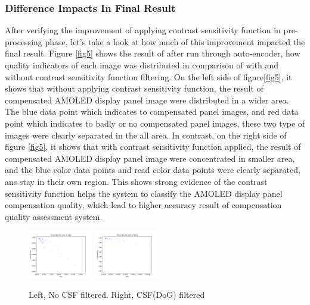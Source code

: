 \documentclass{article}
\begin{document}
\subsubsection{Difference Impacts In Final Result}
After verifying the improvement of applying contrast sensitivity function in pre-processing phase, let's take a look at how much of this improvement impacted the final result. Figure \ref{fig5} shows the result of after run through auto-encoder, how quality indicators of each image was distributed in comparison of with and without contrast sensitivity function filtering.  On the left side of figure\ref{fig5}, it shows that without applying contrast sensitivity function, the result of compensated AMOLED display panel image were distributed in a wider area. The blue data point which indicates to compensated panel images, and red data point which indicates to badly or no compensated panel images, these two type of images were clearly separated in the all area. In contrast, on the right side of figure \ref{fig5}, it shows that with contrast sensitivity function applied, the result of compensated AMOLED display panel image were concentrated in smaller area, and the blue color data points and read color data points were clearly separated, ans stay in their own region. This shows strong evidence of the contrast sensitivity function helps the system to classify the AMOLED display panel compensation quality, which lead to higher accuracy result of compensation quality assessment system.   
\begin{figure}[h]
    \centering
    \includegraphics[width=0.25\textwidth]{images/1440P_NoCSFed_0r_123b_result.png}\Vhfill    
    \includegraphics[width=0.25\textwidth]{images/1440P_CSFed_0r_123b_result.png}\Vhfill
    \caption{Left, No CSF filtered. Right, CSF(DoG) filtered  }
    \label{fig4}
\end{figure}
\end{document}
